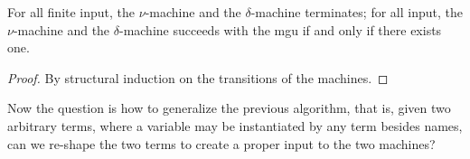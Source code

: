 \documentclass[a4paper,UKenglish]{lipics-v2016}
\begin{document}
\begin{lemma}\label{lemma:numachine}
 For all finite input, the $\nu$-machine and the $\delta$-machine
 terminates; for all input, the $\nu$-machine and the $\delta$-machine
 succeeds with the mgu if and only if there exists one.
\end{lemma}
\begin{proof}
    By structural induction on the transitions of the machines.
\end{proof}


Now the question is how to generalize the previous algorithm, that is,
given two arbitrary terms, where a variable may be instantiated by any
term besides names, can we re-shape the two terms to create a proper
input to the two machines?


\end{document}
